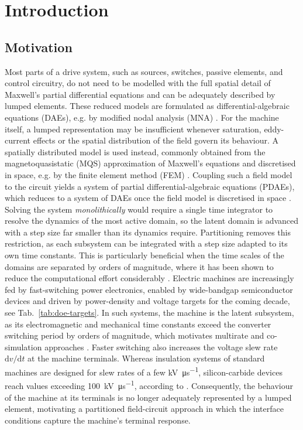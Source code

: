 
\chapter{Introduction} \label{ch:introduction}
\section{Motivation} \label{sec:motivation}
Most parts of a drive system, such as sources, switches, passive elements, and control circuitry, do not need to be modelled with the full spatial detail of Maxwell's partial differential equations \cite{Simonyi1979} and can be adequately described by lumped elements. These reduced models are formulated as differential-algebraic equations (DAEs), e.g. by modified nodal analysis (MNA) \cite{Chung-Wen1975}. For the machine itself, a lumped representation may be insufficient whenever saturation, eddy-current effects or the spatial distribution of the field govern its behaviour. A spatially distributed model is used instead, commonly obtained from the magnetoquasistatic (MQS) approximation of Maxwell's equations and discretised in space, e.g. by the finite element method (FEM) \cite{Monk2003}. Coupling such a field model to the circuit yields a system of partial differential-algebraic equations (PDAEs), which reduces to a system of DAEs once the field model is discretised in space \cite{Garcia2020}. Solving the system \textit{monolithically} would require a single time integrator to resolve the dynamics of the most active domain, so the latent domain is advanced with a step size far smaller than its dynamics require. Partitioning removes this restriction, as each subsystem can be integrated with a step size adapted to its own time constants. This is particularly beneficial when the time scales of the domains are separated by orders of magnitude, where it has been shown to reduce the computational effort considerably \cite{Schoeps2010}. Electric machines are increasingly fed by fast-switching power electronics, enabled by wide-bandgap semiconductor devices and driven by  power-density and voltage targets for the coming decade, see Tab.~\ref{tab:doe-targets}. In such systems, the machine is the latent subsystem, as its electromagnetic and mechanical time constants exceed the converter switching period by orders of magnitude, which motivates multirate and co-simulation approaches \cite{SchoepsDiss, Pels2019}. Faster switching also increases the voltage slew rate $\mathrm{d}v/\mathrm{d}t$ at the machine terminals. Whereas insulation systems of standard machines are designed for slew rates of a few \si{\kilo\volt\per\micro\second}, silicon-carbide devices reach values exceeding \qty{100}{\kilo\volt\per\micro\second}, according to \cite{Petri2022}. Consequently, the behaviour of the machine at its terminals is no longer adequately represented by a lumped element, motivating a partitioned field-circuit approach in which the interface conditions capture the machine's terminal response.

